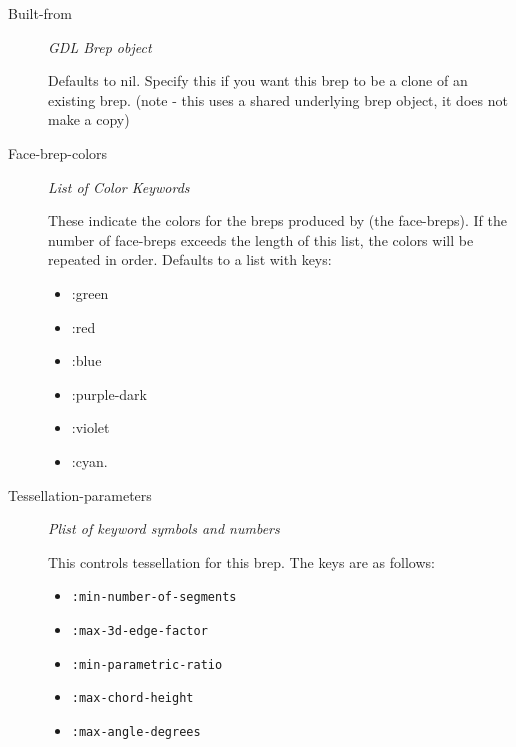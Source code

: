 \documentclass [11pt]{book}
\begin{document}
\begin{itemize}
\begin{description}
\item [Built-from]
\emph{GDL Brep object}

 Defaults to nil.
Specify this if you want this brep to be a clone of an existing brep. (note -
this uses a shared underlying brep object, it does not make a copy)




\item [Face-brep-colors]
\emph{List of Color Keywords}

 These indicate the colors
for the breps produced by (the face-breps). If the
number of face-breps exceeds the length of this list,
the colors will be repeated in order.
Defaults to a list with keys:


\begin{itemize}

\item  :green 

\item  :red 

\item  :blue 

\item  :purple-dark 

\item  :violet 

\item  :cyan. 

\end{itemize}





\item [Tessellation-parameters]
\emph{Plist of keyword symbols and numbers}

 This controls tessellation for this brep.
The keys are as follows:


\begin{itemize}

\item \texttt{:min-number-of-segments}


\item \texttt{:max-3d-edge-factor}


\item \texttt{:min-parametric-ratio}


\item \texttt{:max-chord-height}


\item \texttt{:max-angle-degrees}



\end{itemize}
\end{description}
\end{itemize}
\end{document}

